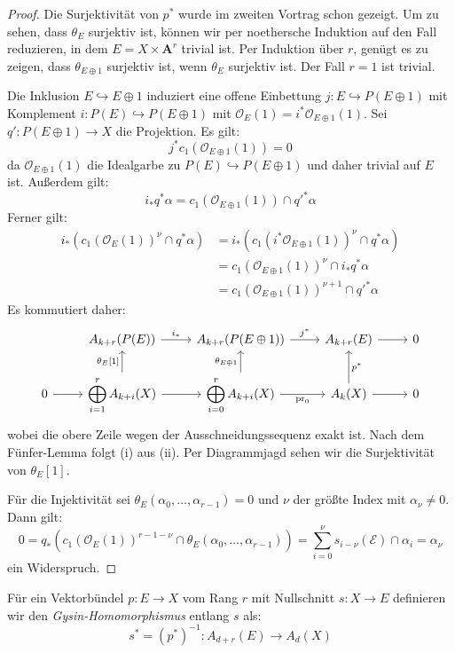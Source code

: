 \documentclass[10pt,a4paper]{article}
\begin{document}
\begin{proof}
Die Surjektivität von $p^\ast$ wurde im zweiten Vortrag schon gezeigt. Um zu sehen, dass $\theta_E$ surjektiv ist, können wir per noethersche Induktion auf den Fall reduzieren, in dem $E=X\times\mathbf{A}^r$ trivial ist. Per Induktion über $r$, genügt es zu zeigen, dass $\theta_{E\oplus 1}$ surjektiv ist, wenn $\theta_E$ surjektiv ist. Der Fall $r=1$ ist trivial.

Die Inklusion $E\hookrightarrow E\oplus 1$ induziert eine offene Einbettung $j: E\hookrightarrow P(E\oplus 1)$ mit Komplement $i: P(E)\hookrightarrow P(E\oplus 1)$ mit $\mathcal{O}_E(1)= i^\ast\mathcal{O}_{E\oplus 1}(1)$. Sei $q': P(E\oplus 1)\to X$ die Projektion. Es gilt:
\[ j^\ast c_1(\mathcal{O}_{E\oplus 1}(1)) = 0 \]
da $\mathcal{O}_{E\oplus 1}(1)$ die Idealgarbe zu $P(E)\hookrightarrow P(E\oplus 1)$ und daher trivial auf $E$ ist. Außerdem gilt:
\[ i_\ast q^\ast\alpha = c_1(\mathcal{O}_{E\oplus 1}(1))\cap q'^\ast\alpha \]
Ferner gilt:
\begin{align*}
i_\ast(c_1(\mathcal{O}_E(1))^\nu \cap q^\ast\alpha) &= i_\ast(c_1(i^\ast\mathcal{O}_{E\oplus 1}(1))^\nu \cap q^\ast\alpha)\\
&= c_1(\mathcal{O}_{E\oplus 1}(1))^\nu\cap i_\ast q^\ast \alpha\\
&= c_1(\mathcal{O}_{E\oplus 1}(1))^{\nu+1}\cap q'^\ast\alpha
\end{align*}
Es kommutiert daher:
\[\begin{tikzcd}
& A_{k + r}(P(E)) \rar["i_\ast"] & A_{k + r}(P(E\oplus 1)) \rar["j^\ast"] & A_{k + r}(E)\rar & 0\\
0 \rar & \displaystyle\bigoplus_{i=1}^r A_{k + i}(X) \rar \uar["\theta_E{[1]}"] & \displaystyle\bigoplus_{i=0}^r A_{k + i}(X) \uar["\theta_{E\oplus 1}"] \rar["\operatorname{pr}_0"']  & A_k(X) \rar\uar["p^\ast"'] & 0
\end{tikzcd}\]
wobei die obere Zeile wegen der Ausschneidungssequenz exakt ist. Nach dem Fünfer-Lemma folgt (i) aus (ii). Per Diagrammjagd sehen wir die Surjektivität von $\theta_E[1]$.

Für die Injektivität sei $\theta_E(\alpha_0,\ldots,\alpha_{r-1})=0$ und $\nu$ der größte Index mit $\alpha_\nu\neq 0$. Dann gilt:
\[ 0 = q_\ast(c_1(\mathcal{O}_E(1))^{r-1-\nu}\cap \theta_E(\alpha_0,\ldots,\alpha_{r-1})) = \sum_{i=0}^\nu s_{i-\nu}(\mathcal{E})\cap\alpha_i = \alpha_\nu \]
ein Widerspruch.
\end{proof}

\begin{definition}
Für ein Vektorbündel $p:E\to X$ vom Rang $r$ mit Nullschnitt $s:X\to E$ definieren wir den \textit{Gysin-Homomorphismus} entlang $s$ als:
\[ s^\ast = (p^\ast)^{-1}: A_{d+r}(E)\to A_d(X) \]
\end{definition}
\end{document}
